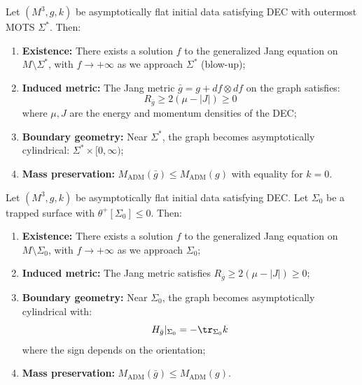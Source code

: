 \begin{theorem}\label{thm:jang-properties}
Let $(M^3, g, k)$ be asymptotically flat initial data satisfying DEC with outermost MOTS $\Sigma^*$. Then:
\begin{enumerate}
\item \textbf{Existence:} There exists a solution $f$ to the generalized Jang equation on $M \setminus \Sigma^*$, with $f \to +\infty$ as we approach $\Sigma^*$ (blow-up);
\item \textbf{Induced metric:} The Jang metric $\bar{g} = g + df \otimes df$ on the graph satisfies:
\begin{equation}
R_{\bar{g}} \geq 2(\mu - |J|) \geq 0
\end{equation}
where $\mu, J$ are the energy and momentum densities of the DEC;
\item \textbf{Boundary geometry:} Near $\Sigma^*$, the graph becomes asymptotically cylindrical: $\Sigma^* \times [0, \infty)$;
\item \textbf{Mass preservation:} $M_{\mathrm{ADM}}(\bar{g}) \leq M_{\mathrm{ADM}}(g)$ with equality for $k = 0$.
\end{enumerate}
\end{theorem}

\begin{theorem}\label{thm:DirectTrappedJang}
Let $(M^3, g, k)$ be asymptotically flat initial data satisfying DEC. Let $\Sigma_0$ be a trapped surface with $\theta^+[\Sigma_0] \leq 0$. Then:
\begin{enumerate}
\item \textbf{Existence:} There exists a solution $f$ to the generalized Jang equation on $M \setminus \Sigma_0$, with $f \to +\infty$ as we approach $\Sigma_0$;
\item \textbf{Induced metric:} The Jang metric satisfies $R_{\bar{g}} \geq 2(\mu - |J|) \geq 0$;
\item \textbf{Boundary geometry:} Near $\Sigma_0$, the graph becomes asymptotically cylindrical with:
\begin{equation}
H_{\bar{g}}|_{\Sigma_0} = -\tr_{\Sigma_0} k
\end{equation}
where the sign depends on the orientation;
\item \textbf{Mass preservation:} $M_{\mathrm{ADM}}(\bar{g}) \leq M_{\mathrm{ADM}}(g)$.
\end{enumerate}
\end{theorem}

